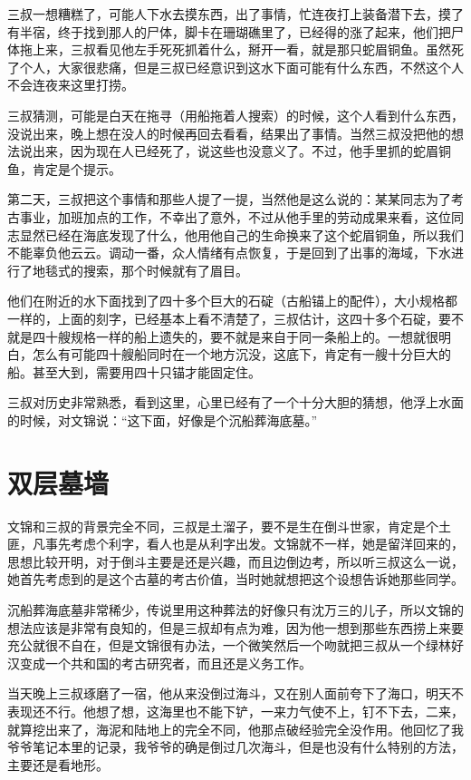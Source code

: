 三叔一想糟糕了，可能人下水去摸东西，出了事情，忙连夜打上装备潜下去，摸了有半宿，终于找到那人的尸体，脚卡在珊瑚礁里了，已经得的涨了起来，他们把尸体拖上来，三叔看见他左手死死抓着什么，掰开一看，就是那只蛇眉铜鱼。虽然死了个人，大家很悲痛，但是三叔已经意识到这水下面可能有什么东西，不然这个人不会连夜来这里打捞。

三叔猜测，可能是白天在拖寻（用船拖着人搜索）的时候，这个人看到什么东西，没说出来，晚上想在没人的时候再回去看看，结果出了事情。当然三叔没把他的想法说出来，因为现在人已经死了，说这些也没意义了。不过，他手里抓的蛇眉铜鱼，肯定是个提示。

第二天，三叔把这个事情和那些人提了一提，当然他是这么说的：某某同志为了考古事业，加班加点的工作，不幸出了意外，不过从他手里的劳动成果来看，这位同志显然已经在海底发现了什么，他用他自己的生命换来了这个蛇眉铜鱼，所以我们不能辜负他云云。调动一番，众人情绪有点恢复，于是回到了出事的海域，下水进行了地毯式的搜索，那个时候就有了眉目。

他们在附近的水下面找到了四十多个巨大的石碇（古船锚上的配件），大小规格都一样的，上面的刻字，已经基本上看不清楚了，三叔估计，这四十多个石碇，要不就是四十艘规格一样的船上遗失的，要不就是来自于同一条船上的。一想就很明白，怎么有可能四十艘船同时在一个地方沉没，这底下，肯定有一艘十分巨大的船。甚至大到，需要用四十只锚才能固定住。

三叔对历史非常熟悉，看到这里，心里已经有了一个十分大胆的猜想，他浮上水面的时候，对文锦说：“这下面，好像是个沉船葬海底墓。”

\chapter{双层墓墙}

文锦和三叔的背景完全不同，三叔是土溜子，要不是生在倒斗世家，肯定是个土匪，凡事先考虑个利字，看人也是从利字出发。文锦就不一样，她是留洋回来的，思想比较开明，对于倒斗主要是还是兴趣，而且边倒边考，所以听三叔这么一说，她首先考虑到的是这个古墓的考古价值，当时她就想把这个设想告诉她那些同学。

沉船葬海底墓非常稀少，传说里用这种葬法的好像只有沈万三的儿子，所以文锦的想法应该是非常有良知的，但是三叔却有点为难，因为他一想到那些东西捞上来要充公就很不自在，但是文锦很有办法，一个微笑然后一个吻就把三叔从一个绿林好汉变成一个共和国的考古研究者，而且还是义务工作。

当天晚上三叔琢磨了一宿，他从来没倒过海斗，又在别人面前夸下了海口，明天不表现还不行。他想了想，这海里也不能下铲，一来力气使不上，钉不下去，二来，就算挖出来了，海泥和陆地上的完全不同，他那点破经验完全没作用。他回忆了我爷爷笔记本里的记录，我爷爷的确是倒过几次海斗，但是也没有什么特别的方法，主要还是看地形。

